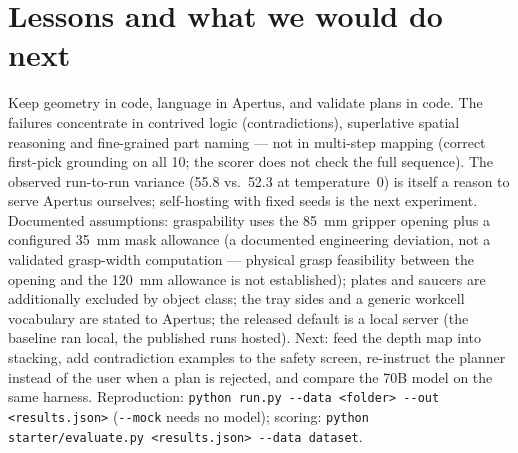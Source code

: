 \documentclass[11pt,a4paper]{article}
\newcommand{\code}[1]{\texttt{#1}}
\begin{document}
\section{Lessons and what we would do next}
Keep geometry in code, language in Apertus, and validate plans in code. The failures
concentrate in contrived logic (contradictions), superlative spatial reasoning and
fine-grained part naming --- not in multi-step mapping (correct first-pick grounding on all
10; the scorer does not check the full sequence). The observed run-to-run variance
(55.8 vs.\ 52.3 at temperature~0) is itself a reason to serve Apertus ourselves;
self-hosting with fixed seeds is the next experiment. Documented assumptions: graspability
uses the 85~mm gripper opening plus a configured 35~mm mask allowance (a documented
engineering deviation, not a validated grasp-width computation --- physical grasp
feasibility between the opening and the 120~mm allowance is not established); plates and
saucers are additionally excluded by object class; the tray
sides and a generic workcell vocabulary are stated to Apertus; the released default is a
local server (the baseline ran local, the published runs hosted). Next: feed the depth map into
stacking, add contradiction examples to the safety screen, re-instruct the planner instead
of the user when a plan is rejected, and compare the 70B model on the same harness.
Reproduction: \code{python run.py -{}-data <folder> -{}-out <results.json>} (\code{-{}-mock}
needs no model); scoring: \code{python starter/evaluate.py <results.json> -{}-data dataset}.
\end{document}
